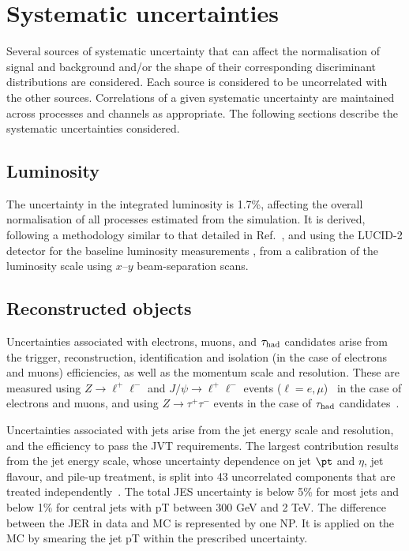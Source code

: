 \section{Systematic uncertainties}
\label{sec:systematics}
				   
Several sources of systematic uncertainty that can affect the normalisation of signal 
and background and/or the shape of their corresponding discriminant distributions are considered.
Each source is considered to be uncorrelated with the other sources.  
Correlations of a given systematic uncertainty are maintained across processes and channels 
as appropriate.
The following sections describe the systematic uncertainties considered.

\subsection{Luminosity}
\label{sec:syst_lumi}

The uncertainty in the integrated luminosity is 1.7\%, affecting the overall normalisation of all processes estimated from the simulation. 
It is derived, following a methodology similar to that detailed in Ref.~\cite{Aaboud:2016hhf}, and using the LUCID-2 detector 
for the baseline luminosity measurements \cite{Avoni:2018iuv}, from a calibration of the luminosity scale using $x$--$y$ beam-separation scans.

\subsection{Reconstructed objects}
\label{sec:syst_objects}

Uncertainties associated with electrons, muons, and $\tau_{\mathrm{had}}$ candidates arise from the trigger, reconstruction,  
identification and isolation (in the case of electrons and muons) efficiencies, as well as the momentum scale and resolution. 
These are measured using $Z\to \ell^+\ell^-$ and $J/\psi\to \ell^+\ell^-$ events ($\ell =e, \mu$)~\cite{ATLAS-CONF-2016-024,Aad:2016jkr} 
in the case of electrons and muons, and using $Z\to \tau^+\tau^-$ events in the case of $\tau_{\mathrm{had}}$ candidates~\cite{ATLAS-CONF-2017-029}.

Uncertainties associated with jets arise from the jet energy scale
and resolution, and the efficiency to pass the JVT requirements. 
The largest contribution results from the jet energy scale, whose uncertainty dependence on jet $\pt$ and $\eta$, jet flavour, and pile-up treatment, 
is split into 43 uncorrelated components that are treated independently~\cite{Aaboud:2017jcu}. The total JES uncertainty is
below 5\% for most jets and below 1\% for central jets with pT between 300 GeV and 2 TeV. The difference between the JER
in data and MC is represented by one NP. It is applied on the MC by smearing the jet pT within the prescribed uncertainty.

